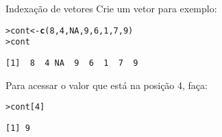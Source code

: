 \documentclass[10pt,handout]{beamer}\usepackage{graphicx, color}
\makeatletter
\newcommand{\hlfunctioncall}[1]{\textcolor[rgb]{0,0,0.545098039215686}{\textbf{#1}}}%
\newenvironment{kframe}{%
 \def\at@end@of@kframe{}%
 \ifinner\ifhmode%
  \def\at@end@of@kframe{\end{minipage}}%
  \begin{minipage}{\columnwidth}%
 \fi\fi%
 \def\FrameCommand##1{\hskip\@totalleftmargin \hskip-\fboxsep
 \colorbox{shadecolor}{##1}\hskip-\fboxsep
     \hskip-\linewidth \hskip-\@totalleftmargin \hskip\columnwidth}%
 \MakeFramed {\advance\hsize-\width
   \@totalleftmargin\z@ \linewidth\hsize
   \@setminipage}}%
 {\par\unskip\endMakeFramed%
 \at@end@of@kframe}
\newenvironment{knitrout}{}{} %
\makeatother
\begin{document}
\begin{frame}[fragile=singleslide]{Indexação de vetores}
Crie um vetor para exemplo:
\begin{knitrout}\small
{}\color{fgcolor}\begin{kframe}
\begin{alltt}
> cont <- \hlfunctioncall{c}(8, 4, NA, 9, 6, 1, 7, 9)
> cont
\end{alltt}
\begin{verbatim}
[1]  8  4 NA  9  6  1  7  9
\end{verbatim}
\end{kframe}
\end{knitrout}

Para acessar o valor que está na posição 4, faça:
\begin{knitrout}\small
{}\color{fgcolor}\begin{kframe}
\begin{alltt}
> cont[4]
\end{alltt}
\begin{verbatim}
[1] 9
\end{verbatim}
\end{kframe}
\end{knitrout}

\begin{center}
\end{center}
\end{frame}
\end{document}
